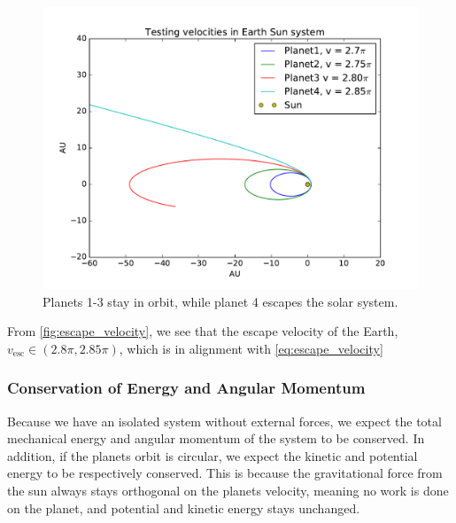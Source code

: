 \documentclass[a4paper]{article}
\begin{document}
\begin{figure}[ht]
\includegraphics[width=\textwidth]{fig/escape_velocity.pdf}
\caption{Planets 1-3 stay in orbit, while planet 4 escapes the solar system.}
\label{fig:escape_velocity}
\end{figure}

From \vref{fig:escape_velocity}, we see that the escape velocity of the Earth, $v_{\mathrm{esc}} \in (2.8\pi, 2.85\pi)$, which is in alignment with \ref{eq:escape_velocity}


\subsubsection{Conservation of Energy and Angular Momentum}
Because we have an isolated system without external forces, we expect the total mechanical energy and angular momentum of the system to be conserved. In addition, if the planets orbit is circular, we expect the kinetic and potential energy to be respectively conserved. This is because the gravitational force from the sun always stays orthogonal on the planets velocity, meaning no work is done on the planet, and potential and kinetic energy stays unchanged.
\end{document}
